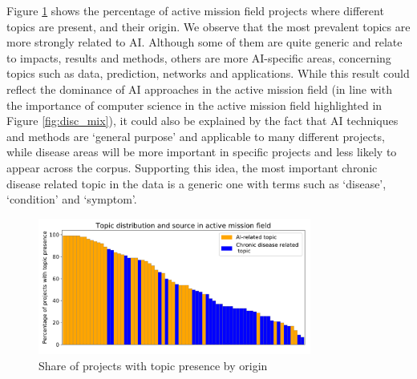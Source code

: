 \documentclass[11pt]{article}
\begin{document}
\label{tab:topics}

Figure \ref{fig:topic_distr} shows the percentage of active mission field projects where different topics are present, and their origin. We observe that the most prevalent topics are more strongly related to AI. Although some of them are quite generic and relate to impacts, results and methods, others are more AI-specific areas, concerning topics such as data, prediction, networks and applications. While this result could reflect the dominance of AI approaches in the active mission field (in line with the importance of computer science in the active mission field highlighted in Figure \ref{fig:disc_mix}), it could also be explained by the fact that AI techniques and methods are `general purpose' and applicable to many different projects, while disease areas will be more important in specific projects and less likely to appear across the corpus. Supporting this idea, the most important chronic disease related topic in the data is a generic one with terms such as `disease', `condition' and `symptom'. 

\begin{figure}[!ht]
    \centering
    \includegraphics[width=0.8\textwidth]{figures/fig_18_distr.pdf}
    \caption{Share of projects with topic presence by origin}
    \label{fig:topic_distr}
\end{figure}
\end{document}
